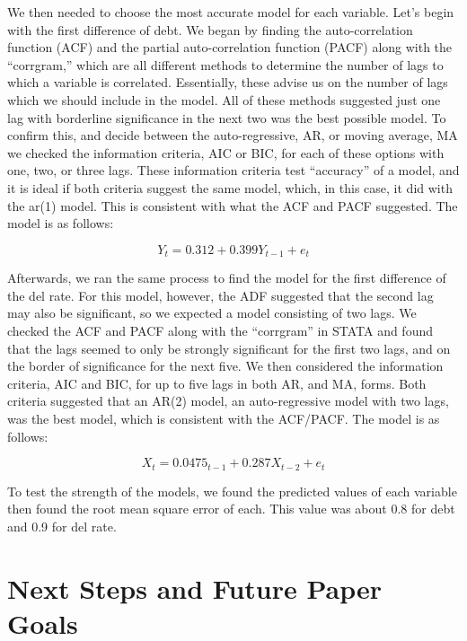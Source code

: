 \documentclass[11pt, oneside]{article}   	%
\begin{document}
We then needed to choose the most accurate model for each variable. Let’s begin with the first difference of debt. We began by finding the auto-correlation function (ACF) and the partial auto-correlation function (PACF) along with the “corrgram,” which are all different methods to determine the number of lags to which a variable is correlated. Essentially, these advise us on the number of lags which we should include in the model. All of these methods suggested just one lag with borderline significance in the next two was the best possible model. To confirm this, and decide between the auto-regressive, AR, or moving average, MA we checked the information criteria, AIC or BIC, for each of these options with one, two, or three lags. These information criteria test “accuracy” of a model, and it is ideal if both criteria suggest the same model, which, in this case, it did with the ar(1) model. This is consistent with what the ACF and PACF suggested. The model is as follows:

\[Y_{t} = 0.312 + 0.399Y_{t-1} + e_{t}\]


Afterwards, we ran the same process to find the model for the first difference of the del rate. For this model, however, the ADF suggested that the second lag may also be significant, so we expected a model consisting of two lags. We checked the ACF and PACF along with the “corrgram” in STATA and found that the lags seemed to only be strongly significant for the first two lags, and on the border of significance for the next five. We then considered the information criteria, AIC and BIC, for up to five lags in both AR, and MA, forms. Both criteria suggested that an AR(2) model, an auto-regressive model with two lags, was the best model, which is consistent with the ACF/PACF. 
The model is as follows: 

\[X_{t} = 0.0475_{t-1} + 0.287X_{t-2} + e_{t}\]


To test the strength of the models, we found the predicted values of each variable then found the root mean square error of each. This value was about 0.8 for debt and 0.9 for del rate. 

\section {Next Steps and Future Paper Goals}
\end{document}
